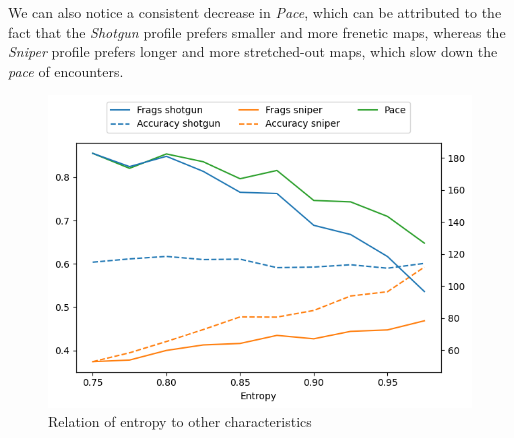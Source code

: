 We can also notice a consistent decrease in \textit{Pace}, which can be attributed to the fact that the \textit{Shotgun} profile prefers smaller and more frenetic maps, whereas the \textit{Sniper} profile prefers longer and more stretched-out maps, which slow down the \textit{pace} of encounters.


\begin{figure}[H]
\centering
\includegraphics[width=0.6\linewidth]{Images/images/experiment_one/entropy_mix.png}
\caption{Relation of entropy to other characteristics}
\label{fig:ex_one_entropy_relations}
\end{figure}


\newpage

